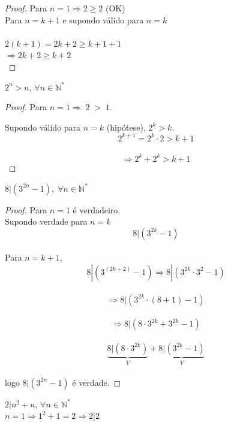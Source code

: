 \begin{proof}
	Para $n=1 \Rightarrow 2 \geq 2$ (OK) \\
	
	\noindent
	Para $n = k + 1$ e supondo válido para $ n = k$ \\ \\
	\noindent
	$ 2(k + 1) = 2k + 2 \geq k + 1 + 1 $ \\
	$ \Rightarrow 2k + 2 \geq k + 2$ \\
\end{proof}

\text{\maltese} $ 2^n > n $, $\forall n \in \mathbb{N^*}$ \\
\begin{proof}
\noindent
Para $n=1 \Rightarrow \; 2 \; > \; 1$.

\noindent
Supondo válido para $n = k$ (hipótese), $ 2^k > k $. \\

$$ 2^{k+1} = 2^k \cdot 2 > k + 1 $$ \\
$$ \Rightarrow 2^k + 2^k > k + 1 $$ 
\end{proof}

\text{\maltese} $ 8 | (3^{2n} - 1), \; \forall n \in \mathbb{N^*} $ \\

\begin{proof}
Para $n = 1$ é verdadeiro.\\

Supondo verdade para $n = k$ \\
$$ 8|(3^{2k} - 1) $$ \\

Para $ n = k + 1 $, \\
$$ 8 | (3^{(2k+2)} - 1) \Rightarrow 8|(3^{2k} \cdot 3^2 - 1)$$ \\
$$ \Rightarrow 8|(3^{2k} \cdot (8 + 1) - 1) $$ \\
$$ \Rightarrow 8| ( 8 \cdot 3^{2k} + 3^{2k} - 1 ) $$ \\
$$ \underbrace{8|(8 \cdot 3^{2k})}_{V} + \underbrace{8|(3^{2k} - 1 )}_{V} $$ \\

logo $ 8|(3^{2n} - 1)$ é verdade.

\end{proof}

\text{\maltese} $ 2|n^2 + n $, $\forall n \in \mathbb{N^*}$ \\

$n = 1 \Rightarrow 1^2 + 1 = 2 \Rightarrow 2|2$ \\

